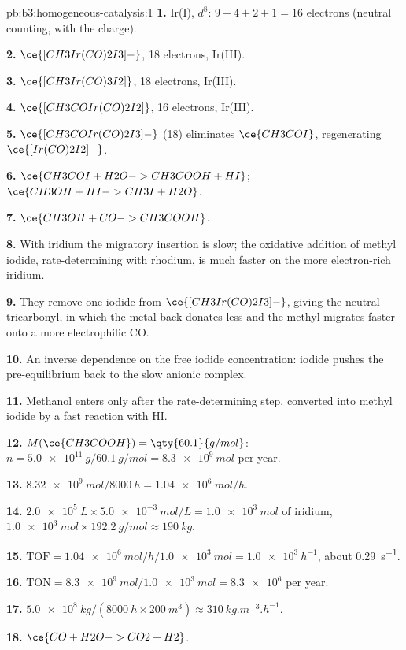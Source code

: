 \begin{solution}{pb:b3:homogeneous-catalysis:1}
\textbf{1.} Ir(I), $d^8$: $9 + 4 + 2 + 1 = 16$ electrons (neutral counting, with the charge).

\textbf{2.} $\ce{[CH3Ir(CO)2I3]-}$, 18 electrons, Ir(III).

\textbf{3.} $\ce{[CH3Ir(CO)3I2]}$, 18 electrons, Ir(III).

\textbf{4.} $\ce{[CH3COIr(CO)2I2]}$, 16 electrons, Ir(III).

\textbf{5.} $\ce{[CH3COIr(CO)2I3]-}$ (18) eliminates $\ce{CH3COI}$, regenerating $\ce{[Ir(CO)2I2]-}$.

\textbf{6.} $\ce{CH3COI + H2O -> CH3COOH + HI}$; $\ce{CH3OH + HI -> CH3I + H2O}$.

\textbf{7.} $\ce{CH3OH + CO -> CH3COOH}$.

\textbf{8.} With iridium the migratory insertion is slow; the oxidative addition of
methyl iodide, rate-determining with rhodium, is much faster on the more
electron-rich iridium.

\textbf{9.} They remove one iodide from $\ce{[CH3Ir(CO)2I3]-}$, giving the neutral tricarbonyl, in which
the metal back-donates less and the methyl migrates faster onto a more
electrophilic CO.

\textbf{10.} An inverse dependence on the free iodide concentration: iodide pushes
the pre-equilibrium back to the slow anionic complex.

\textbf{11.} Methanol enters only after the rate-determining step, converted into
methyl iodide by a fast reaction with HI.

\textbf{12.} $M(\ce{CH3COOH}) = \qty{60.1}{g/mol}$: $n = \qty{5.0e11}{g}/\qty{60.1}{g/mol} = \qty{8.3e9}{mol}$ per year.

\textbf{13.} $\qty{8.32e9}{mol}/\qty{8000}{h} = \qty{1.04e6}{mol/h}$.

\textbf{14.} $\qty{2.0e5}{L} \times \qty{5.0e-3}{mol/L} = \qty{1.0e3}{mol}$ of iridium, $\qty{1.0e3}{mol} \times \qty{192.2}{g/mol} \approx \qty{190}{kg}$.

\textbf{15.} $\mathrm{TOF} = \qty{1.04e6}{mol/h}/\qty{1.0e3}{mol} = \qty{1.0e3}{h^{-1}}$, about \qty{0.29}{s^{-1}}.

\textbf{16.} $\mathrm{TON} = \qty{8.3e9}{mol}/\qty{1.0e3}{mol} = \num{8.3e6}$ per year.

\textbf{17.} $\qty{5.0e8}{kg}/(\qty{8000}{h} \times \qty{200}{m^3}) \approx \qty{310}{kg.m^{-3}.h^{-1}}$.

\textbf{18.} $\ce{CO + H2O -> CO2 + H2}$.


\end{solution}
